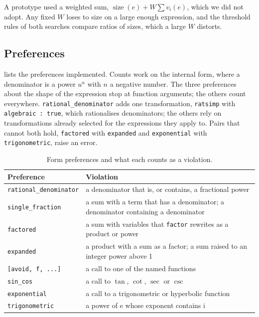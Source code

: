 \documentclass[11pt]{amsart}
\newcommand{\mx}{\lstinline[style=mx]}
\theoremstyle{definition}
\theoremstyle{remark}
\DeclareMathOperator{\size}{size}
\begin{document}
A prototype used a weighted sum, $\size(e) + W\sum v_i(e)$, which we did not
adopt. Any fixed $W$ loses to size on a large enough expression, and the
threshold rules of both searches compare ratios of sizes, which a large $W$
distorts.

\subsection{Preferences}

 lists the preferences implemented. Counts work on the
internal form, where a denominator is a power $u^n$ with $n$ a negative
number. The three preferences about the shape of the expression stop at
function arguments; the others count everywhere. \mx|rational_denominator|
adds one transformation, \mx|ratsimp| with \mx|algebraic : true|, which
rationalises denominators; the others rely on transformations already
selected for the expressions they apply to. Pairs that cannot both hold,
\mx|factored| with \mx|expanded| and \mx|exponential| with
\mx|trigonometric|, raise an error.

\begin{table}[ht]
\caption{Form preferences and what each counts as a violation.}
\label{tab:prefs}
\small
\begin{tabular}{@{}l>{\raggedright\arraybackslash}p{}@{}}
\toprule
Preference & Violation \\
\midrule
\mx|rational_denominator| & a denominator that is, or contains, a fractional power \\
\mx|single_fraction| & a sum with a term that has a denominator; a denominator containing a denominator \\
\mx|factored| & a sum with variables that \mx|factor| rewrites as a product or power \\
\mx|expanded| & a product with a sum as a factor; a sum raised to an integer power above 1 \\
\mx|[avoid, f, ...]| & a call to one of the named functions \\
\mx|sin_cos| & a call to $\tan$, $\cot$, $\sec$ or $\csc$ \\
\mx|exponential| & a call to a trigonometric or hyperbolic function \\
\mx|trigonometric| & a power of $\mathrm{e}$ whose exponent contains $\mathrm{i}$ \\
\bottomrule
\end{tabular}
\end{table}
\end{document}
